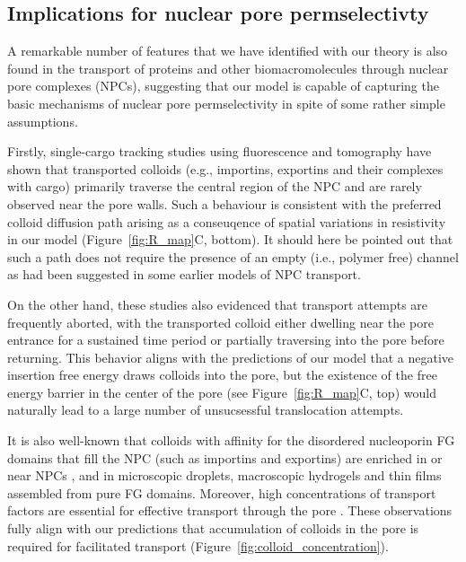 \documentclass[12pt, a4paper]{article}
\begin{document}


\subsection{Implications for nuclear pore permselectivty}

A remarkable number of features that we have identified with our theory is also found in the transport of proteins and other biomacromolecules through nuclear pore complexes (NPCs), suggesting that our model is capable of capturing the basic mechanisms of nuclear pore permselectivity in spite of some rather simple assumptions.

Firstly, single-cargo tracking studies using fluorescence \cite{Musser2016, Lowe2010, Lowe2015, Yang2004, Kubitscheck2000, Ma2010} and tomography \cite{Beck2007} have shown that transported colloids (e.g., importins, exportins and their complexes with cargo) primarily traverse the central region of the NPC and are rarely observed near the pore walls.
Such a behaviour is consistent with the preferred colloid diffusion path arising as a conseuqence of spatial variations in resistivity in our model (Figure~\ref{fig:R_map}C, bottom).
It should here be pointed out that such a path does not require the presence of an empty (i.e., polymer free) channel as had been suggested in some earlier models of NPC transport.

On the other hand, these studies also evidenced that transport attempts are frequently aborted, with the transported colloid either dwelling near the pore entrance for a sustained time period or partially traversing into the pore before returning.
This behavior aligns with the predictions of our model that a negative insertion free energy draws colloids into the pore, but the existence of the free energy barrier in the center of the pore (see Figure~\ref{fig:R_map}C, top) would naturally lead to a large number of unsucsessful translocation attempts.

It is also well-known that colloids with affinity for the disordered nucleoporin FG domains that fill the NPC (such as importins and exportins) are enriched in or near NPCs \cite{Beck2007, Gruenwald2010, Tu2011}, and in microscopic droplets, macroscopic hydrogels and thin films assembled from pure FG domains.
Moreover, high concentrations of transport factors are essential for effective transport through the pore \cite{Lowe2015}.
These observations fully align with our predictions that accumulation of colloids in the pore is required for facilitated transport (Figure~\ref{fig:colloid_concentration}).
\end{document}

